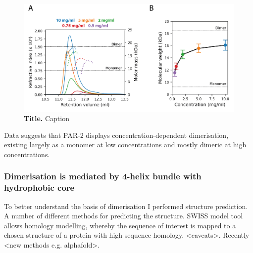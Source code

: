 \documentclass[12pt]{"article"}
\newcommand{\mycaption}[2]{\caption[#1]{\textbf{#1.} #2}}
\begin{document}

\begin{figure}
\includegraphics[scale=1]{sec_mals}
\centering
\mycaption{Title}{
Caption
}
\label{fig:sec_mals}
\end{figure}

Data suggests that PAR-2 displays concentration-dependent dimerisation, existing largely as a monomer at low concentrations and mostly dimeric at high concentrations.\\


\subsubsection{Dimerisation is mediated by 4-helix bundle with hydrophobic core}

To better understand the basis of dimerisation I performed structure prediction. A number of different methods for predicting the structure. SWISS model tool allows homology modelling, whereby the sequence of interest is mapped to a chosen structure of a protein with high sequence homology. <caveats>. Recently <new methods e.g. alphafold>. \citep{Jumper2021} \\
\end{document}
